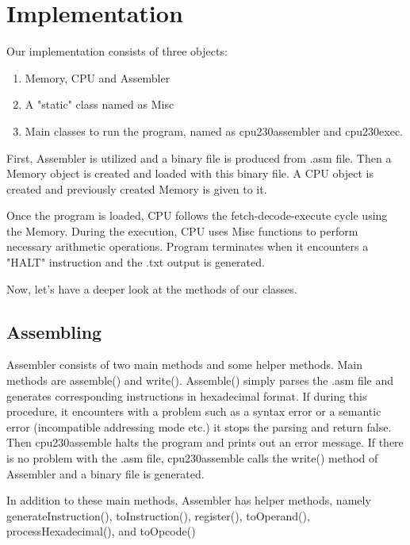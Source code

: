 \documentclass[12pt,a4paper]{article}
\begin{document}
\section{Implementation}

Our implementation consists of three objects:
\begin{enumerate}
    \item Memory, CPU and Assembler
    \item A "static" class named as Misc
    \item Main classes to run the program, named as cpu230assembler and cpu230exec.
\end{enumerate}

First, Assembler is utilized and a binary file is produced from .asm file. Then a Memory object is created and loaded with this binary file. A CPU object is created and previously created Memory is given to it. \par
Once the program is loaded, CPU follows the fetch-decode-execute cycle using the Memory. During the execution, CPU uses Misc functions to perform necessary arithmetic operations. Program terminates when it encounters a "HALT" instruction and the .txt output is generated. \par
Now, let's have a deeper look at the methods of our classes. \par

\subsection{Assembling}

Assembler consists of two main methods and some helper methods. Main methods are assemble() and write(). Assemble() simply parses the .asm file and generates corresponding instructions in hexadecimal format. If during this procedure, it encounters with a problem such as a syntax error or a semantic error (incompatible addressing mode etc.) it stops the parsing and return false. Then cpu230assemble halts the program and prints out an error message. If there is no problem with the .asm file, cpu230assemble calls the write() method of Assembler and a binary file is generated. \par
In addition to these main methods, Assembler has helper methods, namely generateInstruction(), toInstruction(), register(), toOperand(), processHexadecimal(), and toOpcode() \par
\end{document}
